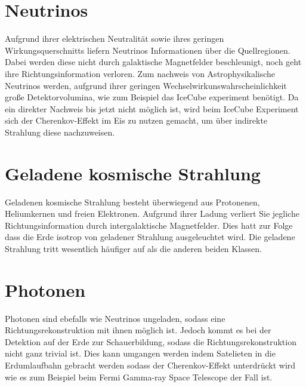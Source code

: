 \section{Neutrinos}
Aufgrund ihrer elektrischen Neutralität sowie ihres geringen Wirkungsquerschnitts liefern Neutrinos Informationen über die Quellregionen. 
Dabei werden diese nicht durch galaktische Magnetfelder beschleunigt, noch geht ihre Richtungsinformation verloren. 
Zum nachweis von Astrophysikalische Neutrinos werden, aufgrund ihrer geringen Wechselwirkunswahrscheinlichkeit große Detektorvolumina, wie zum Beispiel das IceCube experiment benötigt.
Da ein direkter Nachweis bis jetzt nicht möglich ist, wird beim IceCube Experiment sich der Cherenkov-Effekt im Eis zu nutzen gemacht, um über indirekte Strahlung diese nachzuweisen.


\section{Geladene kosmische Strahlung}
Geladenen kosmische Strahlung besteht überwiegend aus Protonenen, Heliumkernen und freien Elektronen. Aufgrund ihrer Ladung verliert Sie jegliche Richtungsinformation durch intergalaktische Magnetfelder. Dies hatt zur Folge dass die Erde isotrop von geladener Strahlung ausgeleuchtet wird. Die geladene Strahlung tritt wesentlich häufiger auf als die anderen beiden Klassen. 

\section{Photonen}
Photonen sind ebefalls wie Neutrinos ungeladen, sodass eine Richtungsrekonstruktion mit ihnen möglich ist. Jedoch kommt es bei der Detektion auf der Erde zur Schauerbildung, sodass die Richtungsrekonstruktion nicht ganz trivial ist. Dies kann umgangen werden indem Satelieten in die Erdumlaufbahn gebracht werden sodass der Cherenkov-Effekt unterdrückt wird wie es zum Beispiel beim Fermi Gamma-ray Space Telescope der Fall ist.


